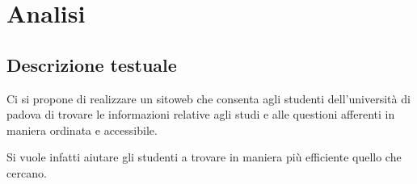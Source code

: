 \section{Analisi}
\subsection{Descrizione testuale}

Ci si propone di realizzare un sitoweb che consenta agli studenti dell'università di padova di trovare le informazioni relative agli studi e alle questioni afferenti in maniera ordinata e accessibile.

Si vuole infatti aiutare gli studenti a trovare in maniera più efficiente quello che cercano.